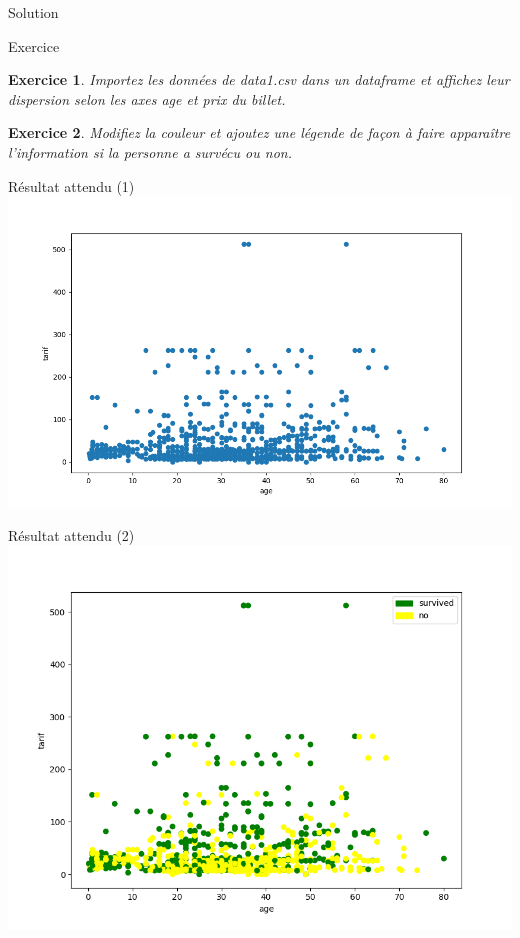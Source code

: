 \documentclass[11pt]{beamer}
\newtheorem{exercice}{Exercice}
\newcommand{\Python}[1]{
	{\small	}
}
\begin{document}
\begin{frame}{Solution}
\Python{ex203}
\end{frame}

\begin{frame}{Exercice}
\begin{exercice}
Importez les données de data1.csv dans un dataframe et affichez leur dispersion selon les axes age et prix du billet.
\end{exercice}
\begin{exercice}
Modifiez la couleur et ajoutez une légende de façon à faire apparaître l'information si la personne a survécu ou non.
\end{exercice}
\end{frame}

\begin{frame}{Résultat attendu (1)}
\includegraphics[scale=0.45]{ex203bis}
\end{frame}

\begin{frame}{Résultat attendu (2)}
\includegraphics[scale=0.45]{ex204}
\end{frame}
\end{document}
